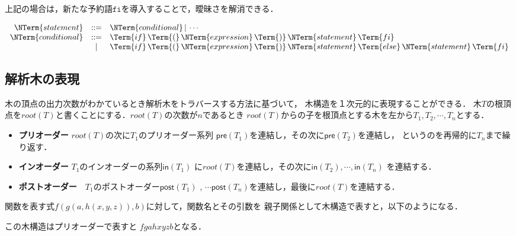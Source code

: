 \documentclass[dvipdfmx,a4j]{jbook}
\begin{document}
上記の場合は，新たな予約語$\mathtt{fi}$を導入することで，曖昧さを解消できる．

\[\begin{array}{rcl}
  \NTerm{statement} & \mathtt{::=} & \NTerm{conditional}\,|\, \cdots\\
  \NTerm{conditional} & \mathtt{::=} & \Term{if}\,\Term{(}\,\NTerm{expression}\,\Term{)}\,\NTerm{statement}\,\Term{fi}\\
  & | & \Term{if}\,\Term{(}\,\NTerm{expression}\,\Term{)}\,\NTerm{statement}\,\Term{else}\,\NTerm{statement}\,\Term{fi}
\end{array}\]

\subsection{解析木の表現}

木の頂点の出力次数がわかているとき解析木をトラバースする方法に基づいて，
木構造を１次元的に表現することができる．
木$T$の根頂点を$root(T)$と書くことにする．$root(T)$の次数が$n$であるとき
$root(T)$からの子を根頂点とする木を左から$T_1,T_2,\cdots,T_n$とする．

\begin{itemize}
  \item {\bf プリオーダー} $root(T)$の次に$T_1$のプリオーダー系列
  $\mathsf{pre}(T_1)$を連結し，その次に$\mathsf{pre}(T_2)$を連結し，
  というのを再帰的に$T_n$まで繰り返す．
  \item {\bf インオーダー} $T_1$のインオーダーの系列$\mathsf{in}(T_1)$
  に$root(T)$を連結し，その次に$\mathsf{in}(T_2), \cdots, \mathsf{in}(T_n)$
  を連結する．
  \item {\bf ポストオーダー}　$T_1$のポストオーダー$\mathsf{post}(T_1)$
  , $\cdots \mathsf{post}(T_n)$を連結し，最後に$root(T)$を連結する．
\end{itemize}

関数を表す式$f(g(a,h(x,y,z)),b)$に対して，関数名とその引数を
親子関係として木構造で表すと，以下のようになる．

この木構造はプリオーダーで表すと $fgahxyzb$となる．
\end{document}
